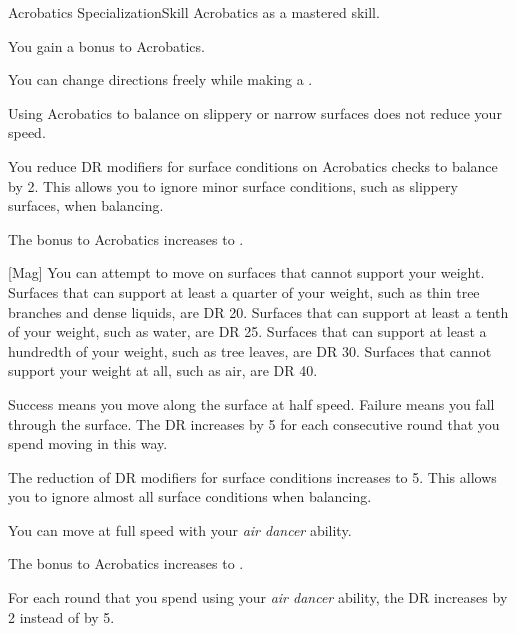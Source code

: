     \begin{feat}{Acrobatics Specialization}{Skill}
        \featpre Acrobatics as a mastered skill.

         You gain a  bonus to Acrobatics.

         You can change directions freely while making a .

         Using Acrobatics to balance on slippery or narrow surfaces does not reduce your speed.

         You reduce DR modifiers for surface conditions on Acrobatics checks to balance by 2.
        This allows you to ignore minor surface conditions, such as slippery surfaces, when balancing.

         The bonus to Acrobatics increases to .

        [Mag] You can attempt to move on surfaces that cannot support your weight.
        Surfaces that can support at least a quarter of your weight, such as thin tree branches and dense liquids, are DR 20.
        Surfaces that can support at least a tenth of your weight, such as water, are DR 25.
        Surfaces that can support at least a hundredth of your weight, such as tree leaves, are DR 30.
        Surfaces that cannot support your weight at all, such as air, are DR 40.

        Success means you move along the surface at half speed.
        Failure means you fall through the surface.
        The DR increases by 5 for each consecutive round that you spend moving in this way.

         The reduction of DR modifiers for surface conditions increases to 5.
        This allows you to ignore almost all surface conditions when balancing.

         You can move at full speed with your \textit{air dancer} ability.

         The bonus to Acrobatics increases to .

         For each round that you spend using your \textit{air dancer} ability, the DR increases by 2 instead of by 5.
    \end{feat}

